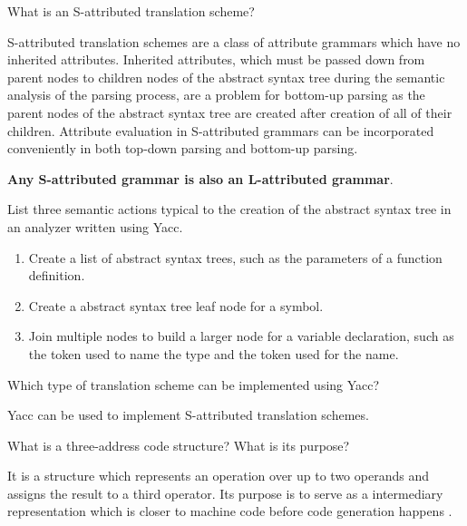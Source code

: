\begin{Exercise}
What is an S-attributed translation scheme?
\end{Exercise}
\begin{Answer}
S-attributed translation schemes are a class of attribute grammars which have no inherited attributes.
Inherited attributes, which must be passed down from parent nodes to children nodes of the abstract syntax tree during the semantic analysis of the parsing process, are a problem for bottom-up parsing as the parent nodes of the abstract syntax tree are created after creation of all of their children.
Attribute evaluation in S-attributed grammars can be incorporated conveniently in both top-down parsing and bottom-up parsing.

\textbf{Any S-attributed grammar is also an L-attributed grammar}.
\end{Answer}

\begin{Exercise}
List three semantic actions typical to the creation of the abstract syntax tree in an analyzer written using Yacc.
\end{Exercise}
\begin{Answer}
\begin{enumerate}
\item Create a list of abstract syntax trees, such as the parameters of a function definition.
\item Create a abstract syntax tree leaf node for a symbol.
\item Join multiple nodes to build a larger node for a variable declaration, such as the token used to name the type and the token used for the name.
\end{enumerate}
\end{Answer}

\begin{Exercise}
Which type of translation scheme can be implemented using Yacc?
\end{Exercise}
\begin{Answer}
Yacc can be used to implement S-attributed translation schemes.
\end{Answer}

\begin{Exercise}
What is a three-address code structure? What is its purpose?
\end{Exercise}
\begin{Answer}
It is a structure which represents an operation over up to two operands and assigns the result to a third operator.
Its purpose is to serve as a intermediary representation which is closer to machine code before code generation happens \cite[p.~358]{compilers-aho-2007}.
\end{Answer}

